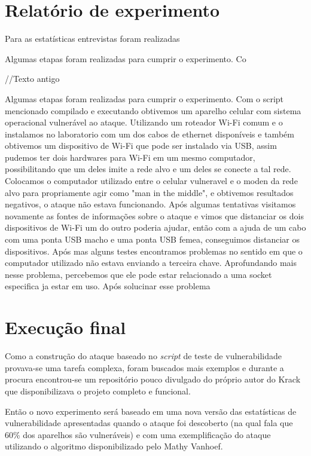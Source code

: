 \documentclass[12pt]{article}
\begin{document}
\section{Relatório de experimento}
Para as estatísticas entrevistas foram realizadas

Algumas etapas foram realizadas para cumprir o experimento. Co



//Texto antigo

Algumas etapas foram realizadas para cumprir o experimento. Com o script mencionado compilado e executando obtivemos um aparelho celular com sistema operacional vulnerável ao ataque. Utilizando um roteador Wi-Fi comum e o instalamos no laboratorio com um dos cabos de ethernet disponíveis e também obtivemos um dispositivo de Wi-Fi que pode ser instalado via USB, assim pudemos ter dois hardwares para Wi-Fi em um mesmo computador, possibilitando que um deles imite a rede alvo e um deles se conecte a tal rede. Colocamos o computador utilizado entre o celular vulneravel e o moden da rede alvo para propriamente agir como "man in the middle", e obtivemos resultados negativos, o ataque não estava funcionando. Após algumas tentativas visitamos novamente as fontes de informações sobre o ataque e vimos que distanciar os dois dispositivos de Wi-Fi um do outro poderia ajudar, então com a ajuda de um cabo com uma ponta USB macho e uma ponta USB femea, conseguimos distanciar os dispositivos. Após mas alguns testes encontramos problemas no sentido em que o computador utilizado não estava enviando a terceira chave. Aprofundando mais nesse problema, percebemos que ele pode estar relacionado a uma socket especifica ja estar em uso. Após solucinar esse problema

\section{Execução final}
Como a construção do ataque baseado no \textit{script} de teste de vulnerabilidade provava-se uma tarefa complexa, foram buscados mais exemplos e durante a procura encontrou-se um repositório pouco divulgado do próprio autor do Krack que disponibilizava o projeto completo e funcional.

Então o novo experimento será baseado em uma nova versão das estatísticas de vulnerabilidade apresentadas quando o ataque foi descoberto (na qual fala que 60\% dos aparelhos são vulneráveis) e com uma exemplificação do ataque utilizando o algoritmo disponibilizado pelo Mathy Vanhoef.
\end{document}
